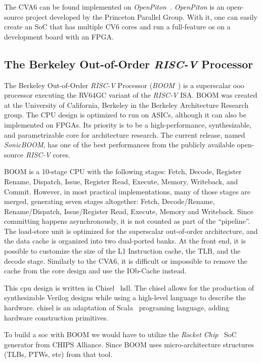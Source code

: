 The CVA6 can be found implemented on \textit{OpenPiton}~\cite{Balkind:2016:OOS:2872362.2872414}. \textit{OpenPiton} is an open-source project developed by the Princeton Parallel Group. With it, one can easily create an SoC that has multiple CV6 cores and run a full-feature \acrfull{os} on a development board with an FPGA.

\subsection{The Berkeley Out-of-Order \textit{RISC-V} Processor}
The Berkeley Out-of-Order \textit{RISC-V} Processor (\textit{BOOM}~\cite{zhaosonicboom}) is a superscalar \acrfull{ooo} processor executing the RV64GC variant of the \textit{RISC-V} ISA. BOOM was created at the University of California, Berkeley in the Berkeley Architecture Research group. The CPU design is optimized to run on ASICs, although it can also be implemented on FPGAs. Its priority is to be a high-performance, synthesizable, and parametrizable core for architecture research. The current release, named \textit{SonicBOOM}, has one of the best performances from the publicly available open-source \textit{RISC-V} cores.

BOOM is a 10-stage CPU with the following stages: Fetch, Decode, Register Rename, Dispatch, Issue, Register Read, Execute, Memory, Writeback, and Commit. However, in most practical implementations, many of those stages are merged, generating seven stages altogether: Fetch, Decode/Rename, Rename/Dispatch, Issue/Register Read, Execute, Memory and Writeback. Since committing happens asynchronously, it is not counted as part of the \enquote{pipeline}. The load-store unit is optimized for the superscalar out-of-order architecture, and the data cache is organized into two dual-ported banks. At the front end, it is possible to customize the size of the L1 Instruction cache, the TLB, and the decode stage. Similarly to the CVA6, it is difficult or impossible to remove the cache from the core design and use the IOb-Cache instead.

This \acrshort{cpu} design is written in Chisel~\cite{bachrach2012chisel} \acrfull{hdl}. The \acrfull{chisel} allows for the production of synthesizable Verilog designs while using a high-level language to describe the hardware. \acrshort{chisel} is an adaptation of Scala~\cite{odersky2004scala} programing language, adding hardware construction primitives.

To build a \acrfull{soc} with BOOM we would have to utilize the \textit{Rocket Chip}~\cite{asanovic2016rocket} SoC generator from CHIPS Alliance. Since BOOM uses micro-architecture structures (TLBs, PTWs, etc) from that tool.

